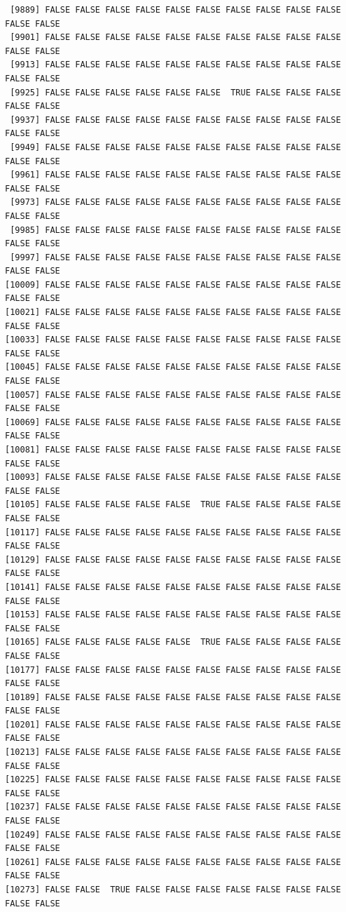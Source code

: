 \documentclass[
  a4paper,
  DIV=11,
  numbers=noendperiod]{scrartcl}
\begin{document}
\begin{verbatim}
 [9889] FALSE FALSE FALSE FALSE FALSE FALSE FALSE FALSE FALSE FALSE FALSE FALSE
 [9901] FALSE FALSE FALSE FALSE FALSE FALSE FALSE FALSE FALSE FALSE FALSE FALSE
 [9913] FALSE FALSE FALSE FALSE FALSE FALSE FALSE FALSE FALSE FALSE FALSE FALSE
 [9925] FALSE FALSE FALSE FALSE FALSE FALSE  TRUE FALSE FALSE FALSE FALSE FALSE
 [9937] FALSE FALSE FALSE FALSE FALSE FALSE FALSE FALSE FALSE FALSE FALSE FALSE
 [9949] FALSE FALSE FALSE FALSE FALSE FALSE FALSE FALSE FALSE FALSE FALSE FALSE
 [9961] FALSE FALSE FALSE FALSE FALSE FALSE FALSE FALSE FALSE FALSE FALSE FALSE
 [9973] FALSE FALSE FALSE FALSE FALSE FALSE FALSE FALSE FALSE FALSE FALSE FALSE
 [9985] FALSE FALSE FALSE FALSE FALSE FALSE FALSE FALSE FALSE FALSE FALSE FALSE
 [9997] FALSE FALSE FALSE FALSE FALSE FALSE FALSE FALSE FALSE FALSE FALSE FALSE
[10009] FALSE FALSE FALSE FALSE FALSE FALSE FALSE FALSE FALSE FALSE FALSE FALSE
[10021] FALSE FALSE FALSE FALSE FALSE FALSE FALSE FALSE FALSE FALSE FALSE FALSE
[10033] FALSE FALSE FALSE FALSE FALSE FALSE FALSE FALSE FALSE FALSE FALSE FALSE
[10045] FALSE FALSE FALSE FALSE FALSE FALSE FALSE FALSE FALSE FALSE FALSE FALSE
[10057] FALSE FALSE FALSE FALSE FALSE FALSE FALSE FALSE FALSE FALSE FALSE FALSE
[10069] FALSE FALSE FALSE FALSE FALSE FALSE FALSE FALSE FALSE FALSE FALSE FALSE
[10081] FALSE FALSE FALSE FALSE FALSE FALSE FALSE FALSE FALSE FALSE FALSE FALSE
[10093] FALSE FALSE FALSE FALSE FALSE FALSE FALSE FALSE FALSE FALSE FALSE FALSE
[10105] FALSE FALSE FALSE FALSE FALSE  TRUE FALSE FALSE FALSE FALSE FALSE FALSE
[10117] FALSE FALSE FALSE FALSE FALSE FALSE FALSE FALSE FALSE FALSE FALSE FALSE
[10129] FALSE FALSE FALSE FALSE FALSE FALSE FALSE FALSE FALSE FALSE FALSE FALSE
[10141] FALSE FALSE FALSE FALSE FALSE FALSE FALSE FALSE FALSE FALSE FALSE FALSE
[10153] FALSE FALSE FALSE FALSE FALSE FALSE FALSE FALSE FALSE FALSE FALSE FALSE
[10165] FALSE FALSE FALSE FALSE FALSE  TRUE FALSE FALSE FALSE FALSE FALSE FALSE
[10177] FALSE FALSE FALSE FALSE FALSE FALSE FALSE FALSE FALSE FALSE FALSE FALSE
[10189] FALSE FALSE FALSE FALSE FALSE FALSE FALSE FALSE FALSE FALSE FALSE FALSE
[10201] FALSE FALSE FALSE FALSE FALSE FALSE FALSE FALSE FALSE FALSE FALSE FALSE
[10213] FALSE FALSE FALSE FALSE FALSE FALSE FALSE FALSE FALSE FALSE FALSE FALSE
[10225] FALSE FALSE FALSE FALSE FALSE FALSE FALSE FALSE FALSE FALSE FALSE FALSE
[10237] FALSE FALSE FALSE FALSE FALSE FALSE FALSE FALSE FALSE FALSE FALSE FALSE
[10249] FALSE FALSE FALSE FALSE FALSE FALSE FALSE FALSE FALSE FALSE FALSE FALSE
[10261] FALSE FALSE FALSE FALSE FALSE FALSE FALSE FALSE FALSE FALSE FALSE FALSE
[10273] FALSE FALSE  TRUE FALSE FALSE FALSE FALSE FALSE FALSE FALSE FALSE FALSE

\end{verbatim}
\end{document}
